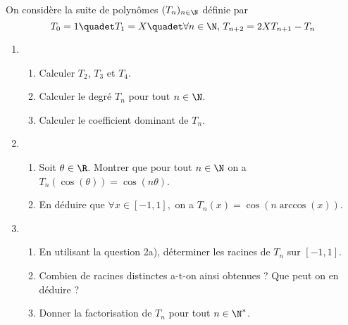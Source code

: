\documentclass[a4paper, 11pt,reqno]{article}
\begin{document}
\begin{exercice}
On considère la suite de polynômes $(T_n)_{n\in \N}$ définie par 
$$ T_0=1 \quadet T_1=X \quadet \forall n\in \N,\, T_{n+2}=2X T_{n+1}-T_n$$
\begin{enumerate}
\item \begin{enumerate}
\item Calculer $T_2$, $T_3$ et $T_4$.
\item Calculer le degré  $T_n$ pour tout $n\in\N$. 
\item Calculer le coefficient dominant de $T_n$. 
\end{enumerate}
\item \begin{enumerate}
\item Soit $\theta \in \R$. Montrer que pour tout $n\in \N$ on  a  $T_n(\cos(\theta)) =\cos(n\theta)$.
\item En déduire que $\forall x\in [-1,1], $ on a $T_n(x) =\cos(n \arccos(x))$. 
\end{enumerate}
\item \begin{enumerate}
\item En utilisant la question 2a), déterminer les racines de $T_n$ sur $[-1,1]$. 
\item Combien de racines distinctes a-t-on ainsi obtenues ? Que peut on en déduire ? 
\item Donner la factorisation de $T_n$ pour tout $n\in \N^*$. 
\end{enumerate}
\end{enumerate}
\end{exercice}
\end{document}
